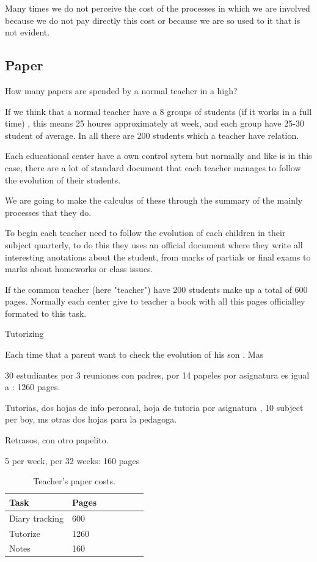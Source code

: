 Many times we do not perceive the cost of the processes in which we are involved because we do not pay directly this cost or because we are so used to it that is not evident.

\subsection{Paper}

How many papers are spended by a normal teacher in a high?

If we think that a normal teacher have a 8 groups of students (if it works in a full time) ,  this means 25 houres approximately at week, and each group have 25-30 student of average. In all there are 200 students which a teacher have relation.

Each educational center have a own control sytem but normally and like is in this case, there are a lot of standard document that each teacher manages to follow the evolution of their students.

We are going to make the calculus of  these through the summary of the mainly processes that they do.


To begin each teacher need to follow the evolution of each children in their subject quarterly, to do this they uses an official document where they write all interesting anotations about the student, from marks of partials or final exams to marks about homeworks or class issues.

If the common teacher (here "teacher") have 200 students make up a total of 600 pages. Normally each center give to teacher a book with all this pages officialley formated to this task.




Tutorizing

Each time that a parent want to check the evolution of his son  . Mas

30 estudiantes por 3 reuniones con padres, por 14 papeles por
asignatura es igual a : 1260 pages.



Tutorias, dos hojas de info peronsal, hoja de tutoria por asignatura , 10 subject per boy, ms otras dos hojas para la pedagoga.



Retrasos, con otro papelito.

5 per week, per 32 weeks: 160 pages

\begin{table}[]
\centering

\begin{tabular}{@{}lllllll@{}}

Task & Pages\\
\midrule

Diary tracking & 600 \\
Tutorize & 1260 \\
Notes & 160 \\

\end{tabular}
\caption{Teacher's paper costs.}
\label{my-label}
\end{table}


